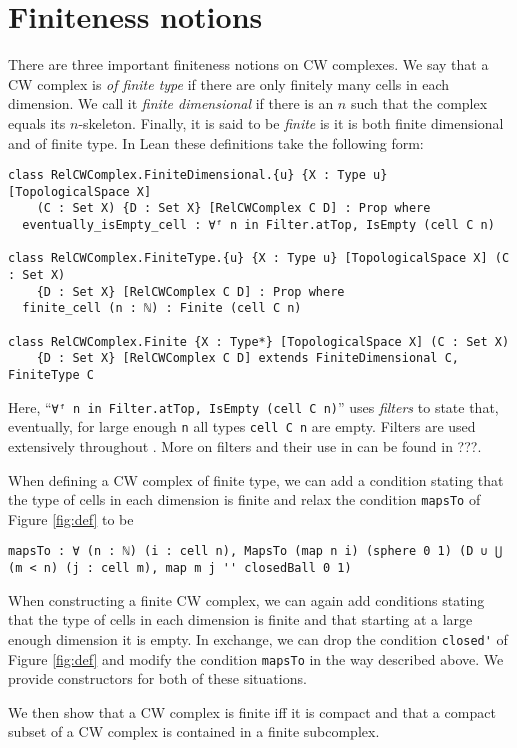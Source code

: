 \section{Finiteness notions}


There are three important finiteness notions on CW complexes. 
We say that a CW complex is \emph{of finite type} if there are only finitely many cells in each dimension. 
We call it \emph{finite dimensional} if there is an $n$ such that the complex equals its $n$-skeleton.
Finally, it is said to be \emph{finite} is it is both finite dimensional and of finite type. 
In Lean these definitions take the following form: 

\begin{lstlisting}[frame=single]
class RelCWComplex.FiniteDimensional.{u} {X : Type u} [TopologicalSpace X] 
    (C : Set X) {D : Set X} [RelCWComplex C D] : Prop where
  eventually_isEmpty_cell : ∀ᶠ n in Filter.atTop, IsEmpty (cell C n)

class RelCWComplex.FiniteType.{u} {X : Type u} [TopologicalSpace X] (C : Set X) 
    {D : Set X} [RelCWComplex C D] : Prop where
  finite_cell (n : ℕ) : Finite (cell C n)

class RelCWComplex.Finite {X : Type*} [TopologicalSpace X] (C : Set X) 
    {D : Set X} [RelCWComplex C D] extends FiniteDimensional C, FiniteType C
\end{lstlisting}

Here, ``\lstinline|∀ᶠ n in Filter.atTop, IsEmpty (cell C n)|'' uses \emph{filters} to state that, eventually, for large enough \lstinline|n| all types \lstinline|cell C n| are empty. 
Filters are used extensively throughout \mathlib. 
More on filters and their use in \mathlib can be found in ???. 

When defining a CW complex of finite type, we can add a condition stating that the type of cells in each dimension is finite and relax the condition \lstinline|mapsTo| of Figure \ref{fig:def} to be

\begin{lstlisting}[frame=single]
mapsTo : ∀ (n : ℕ) (i : cell n), MapsTo (map n i) (sphere 0 1) (D ∪ ⋃ (m < n) (j : cell m), map m j '' closedBall 0 1)
\end{lstlisting}

When constructing a finite CW complex, we can again add conditions stating that the type of cells in each dimension is finite and that starting at a large enough dimension it is empty.
In exchange, we can drop the condition \lstinline|closed'| of Figure \ref{fig:def} and modify the condition \lstinline|mapsTo| in the way described above. 
We provide constructors for both of these situations.

We then show that a CW complex is finite iff it is compact and that a compact subset of a CW complex is contained in a finite subcomplex.